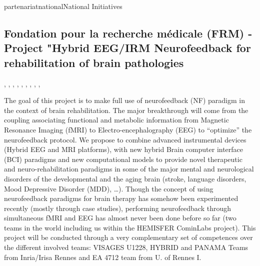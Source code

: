 \documentclass{ra2018}
\begin{document}
\begin{module}{partenariat}{national}{National Initiatives}
         \subsection{Fondation pour la recherche médicale (FRM) - Project "Hybrid EEG/IRM Neurofeedback for  rehabilitation of brain pathologies}
        \begin{participants}
        	, 
        	,
        	, 
        	,
        	, 
        	, 
        	, 
        	,
        	, 
        \end{participants}	
        
        The goal of this project is to make full use of neurofeedback (NF) paradigm in the context of brain
rehabilitation. The major breakthrough will come from the coupling associating functional and
metabolic information from Magnetic Resonance Imaging (fMRI) to Electro-encephalography (EEG)
to “optimize” the neurofeedback protocol. We propose to combine advanced instrumental devices
(Hybrid EEG and MRI platforms), with new hybrid Brain computer interface (BCI) paradigms and
new computational models to provide novel therapeutic and neuro-rehabilitation paradigms in
some of the major mental and neurological disorders of the developmental and the aging brain
(stroke, language disorders, Mood Depressive Disorder (MDD), …). Though the concept of using
neurofeedback paradigms for brain therapy has somehow been experimented recently (mostly
through case studies), performing neurofeedback through simultaneous fMRI and EEG has almost
never been done before so far (two teams in the world including us within the HEMISFER CominLabs project).
This project will be conducted through a very complementary set of competences over the different
involved teams: VISAGES U1228, HYBRID and PANAMA Teams from Inria/Irisa Rennes and EA 4712
team from U. of Rennes I.


\end{module}
\end{document}
